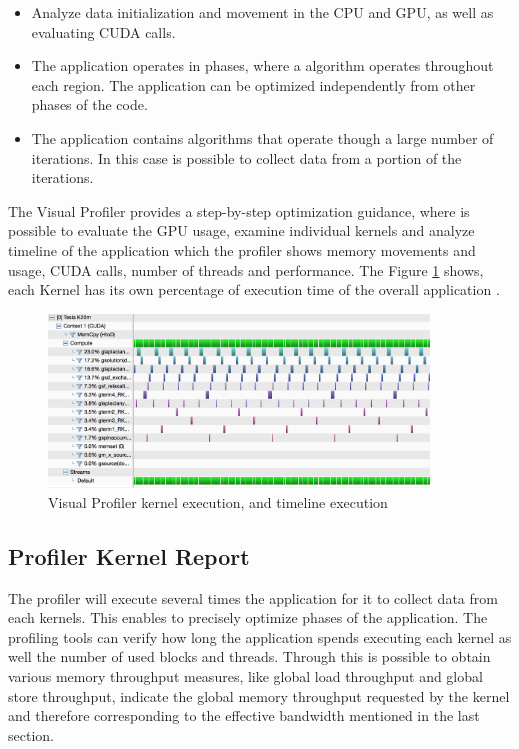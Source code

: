 \begin{itemize}
  \item Analyze data initialization and movement in the CPU and GPU, as well as evaluating CUDA calls.
  \item The application operates in phases, where a algorithm operates throughout each region. The application can be optimized independently from other phases of the code.
  \item The application contains algorithms that operate though a large number of iterations. In this case is possible to collect data from a portion of the iterations.
\end{itemize}

The Visual Profiler provides a step-by-step optimization guidance, where is possible to evaluate the GPU usage, examine individual kernels and analyze timeline of the application which the profiler shows memory movements and usage, CUDA calls, number of threads and performance. The Figure \ref{fig:visual01} shows, each Kernel has its own percentage of execution time of the overall application \cite{practices}.

\begin{figure}[htbp]
	\centering
		\includegraphics[width=0.9\textwidth]{Figures/pofiler.png}
		\smallskip
	\caption[Visual Profiler timeline and stream process]{Visual Profiler kernel execution, and timeline execution}
	\label{fig:visual01}
\end{figure}

\subsection{Profiler Kernel Report}

The profiler will execute several times the application for it to collect data from each kernels. This enables to precisely optimize phases of the application\cite{example}. The profiling tools can verify how long the application spends executing each kernel as well the number of used blocks and threads. Through this is possible to obtain various memory throughput measures, like global load throughput and global store throughput, indicate the global memory throughput requested by the kernel and therefore corresponding to the effective bandwidth mentioned in the last section.

